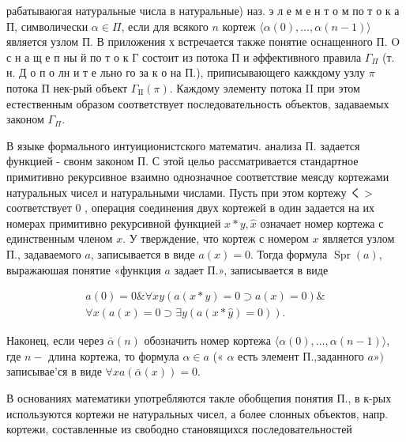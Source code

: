 \documentclass[10pt]{article}
\begin{document}
рабатываюгая натуральные числа в натуральные) наз. э л е м е н т о м по т о к а П, символически $\alpha \in \Pi$, если для всякого $n$ кортеж $\langle\alpha(0), \ldots, \alpha(n-1)\rangle$ является узлом П. В приложения х встречается также понятие оснащенного П. $\mathrm{O}$ с н а щ $е$ п ны й по т о к $Г$ состоит из потока П и әффективного правила $\Gamma_{\Pi}$ (т. н. Д о п о лн и т е льно го за к о на П.), приписывающего кажкдому узлу $\pi$ потока П нек-рый объект $\Gamma_{\mathrm{II}}(\pi)$. Каждому элементу потока II при этом естественным образом соответствует последовательность объектов, задаваемых законом $\Gamma_{\Pi}$.



В языке формального интуиционистского математич. анализа П. задается функцией - свонм законом П. С этой цельо рассматривается стандартное примитивно рекурсивное взаимно однозначное соответствие меясду кортежами натуральных чисел и натуральными числами. Пусть при этом кортежу $く>$ соответствует 0 , операция соединения двух кортежей в один задается на их номерах примитивно рекурсивной функцией $x * y, \hat{x}$ означает номер кортежа с единственным членом $x$. У тверждение, что кортеж с номером $x$ является узлом П., задаваемого $a$, записывается в виде $a(x)=0$. Тогда формула $\operatorname{Spr}(a)$, выражаюшая понятие «функция $a$ задает П.», записывается в виде



\[

\begin{gathered}

a(0)=0 \& \forall x y(a(x * y)=0 \supset a(x)=0) \& \\

\forall x(a(x)=0 \supset \exists y(a(x * \widehat{y})=0)) .

\end{gathered}

\]



Наконец, если через $\bar{\alpha}(n)$ обозначить номер кортежа $\langle\alpha(0), \ldots, \alpha(n-1)\rangle$, где $n-$ длина кортежа, то формула $\alpha \in a$ (« $\alpha$ есть элемент П.,заданного $a »)$ записывае'ся в виде $\forall x a(\bar{\alpha}(x))=0$.



В основаниях математики употребляются такле обобщепия понятия П., в к-рых используются кортежи не натуральных чисел, а более слонных объектов, напр. кортежи, составленные из свободно становящихся последовательностей
\end{document}
